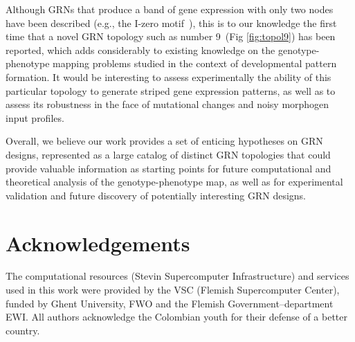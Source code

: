 \documentclass[10pt,letterpaper]{article}
\begin{document}
Although GRNs that produce a band of gene expression with only two nodes have
been described (e.g., the I-zero motif~\cite{Schaerli2014}), this is to our
knowledge the first time that a novel GRN topology such as number
9~(Fig \ref{fig:topol9}) has been reported, which adds considerably to existing
knowledge on the genotype-phenotype mapping problems studied in the
context of developmental pattern formation. It would be interesting to assess
experimentally the ability of this particular topology to generate striped gene
expression patterns, as well as to assess its robustness in the face of mutational
changes and noisy morphogen input profiles.

Overall, we believe our work provides a set of enticing hypotheses on GRN designs,
represented as a large catalog of distinct GRN topologies that could provide
valuable information as starting points for future computational and theoretical
analysis of the genotype-phenotype map, as well as for experimental validation and
future discovery of potentially interesting GRN designs.

\section*{Acknowledgements}
The computational resources (Stevin Supercomputer Infrastructure) and
services used in this work were provided by the VSC (Flemish Supercomputer
Center), funded by Ghent University, FWO and the Flemish Government–department EWI.
All authors acknowledge the Colombian youth for their defense of a better
country.

\nolinenumbers
\end{document}
